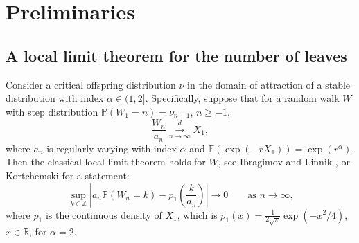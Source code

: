 \documentclass[11pt,a4paper]{article}
\newcommand{\convd}{\overset{d}{\underset{{n\rightarrow \infty}}{\longrightarrow}}}
\newcommand{\bP}{\mathbb{P}}
\newcommand{\bR}{\mathbb{R}}
\newcommand{\bE}{\mathbb{E}}
\newcommand{\cG}{\mathcal{G}}
\newcommand{\bZ}{\mathbb{Z}}
\newcommand{\lambdaLaplace}{r}
\begin{document}
\section{Preliminaries}\label{sec2}

\subsection{A local limit theorem for the number of leaves}\label{sec2.1}

Consider a critical offspring distribution $\nu$ in the domain of attraction of a stable distribution with index $\alpha\in(1,2]$. Specifically, suppose that for a random walk $W$ with step distribution $\bP(W_1=n)=\nu_{n+1}$, $n\ge -1$,
\begin{equation}\label{regvarass}\frac{W_n}{a_n}\convd X_1,
\end{equation}
where $a_n$ is regularly varying with index $\alpha$ and $\bE(\exp(-\lambdaLaplace X_1))=\exp(\lambdaLaplace^\alpha)$.  
Then the classical local limit theorem holds for $W$, see Ibragimov and Linnik \cite[Theorem 4.2.1]{IbL71}, or Kortchemski \cite[Theorem 1.10]{Kor12} for a statement:
$$\sup_{k\in\bZ}\left|a_n\bP(W_n=k)-p_1\left(\frac{k}{a_n}\right)\right|\rightarrow 0\qquad\mbox{as $n\rightarrow\infty$,}$$
where $p_1$ is the continuous density of $X_1$, which is $p_1(x)=\frac{1}{2\sqrt{\pi}}\exp(-x^2/4)$, $x\in\bR$, for $\alpha=2$.
\end{document}
